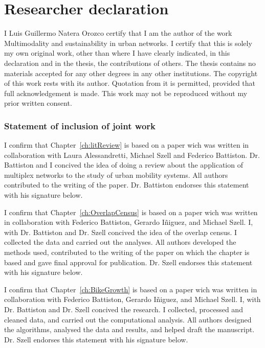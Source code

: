 \documentclass[a4paper,twoside,12pt]{book}
\begin{document}
\pagestyle{empty}

\newpage


\chapter*{Researcher declaration}
I Luis Guillermo Natera Orozco certify that I am the author of the work Multimodality and sustainability in urban networks. I certify that this is solely my own original work, other than where I have clearly indicated, in this declaration and in the thesis, the contributions of others. The thesis contains no materials accepted for any other degrees in any other institutions.  The copyright of this work rests with its author. Quotation from it is permitted, provided that full acknowledgement is made. This work may not be reproduced without my prior written consent.

\subsection*{Statement of inclusion of joint work}
I confirm that Chapter~\ref{ch:litReview} is based on a paper wich was written in collaboration with Laura Alessandretti, Michael Szell and Federico Battiston. Dr. Battiston and I concived the idea of doing a review about the application of multiplex networks to the study of urban mobility systems. All authors contributed to the writing of the paper. Dr. Battiston endorses this statement with his signature below.

\vspace{.2cm}

I confirm that Chapter~\ref{ch:OverlapCensus} is based on a paper wich was written in collaboration with Federico Battiston, Gerardo I\~niguez, and Michael Szell. I, with Dr. Battiston and Dr. Szell concived the idea of the overlap census. I collected the data and carried out the analyses. All authors developed the methods used, contributed to the writing of the paper on which the chapter is based and gave final approval for publication. Dr. Szell endorses this statement with his signature below.

\vspace{.2cm}

I confirm that Chapter~\ref{ch:BikeGrowth} is based on a paper wich was written in collaboration with Federico Battiston, Gerardo I\~niguez, and Michael Szell. I, with Dr. Battiston and Dr. Szell concived the research. I collected, processed and cleaned data, and carried out the computational analysis. All authors designed the algorithms, analysed the data and results, and helped draft the manuscript. Dr. Szell endorses this statement with his signature below.
\end{document}
